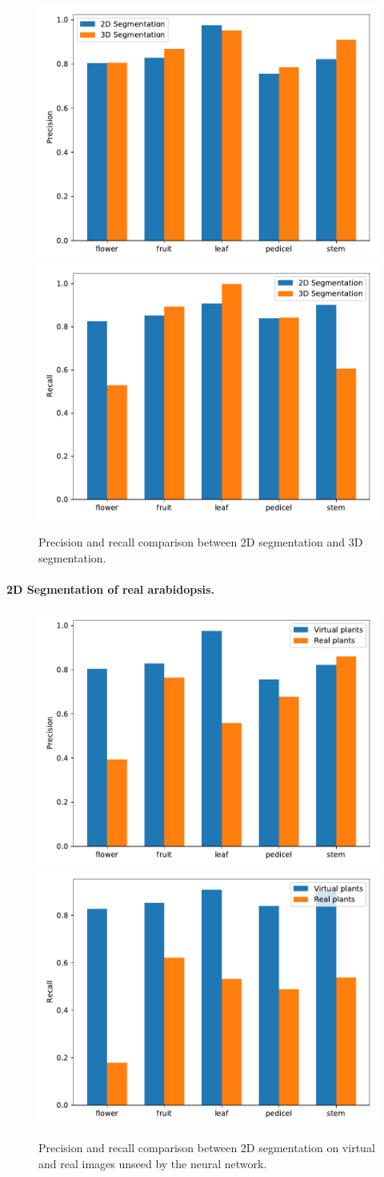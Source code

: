 \begin{figure}
    \centering \includegraphics[width = 0.5\linewidth]{figures/eval_precision.pdf}\includegraphics[width = 0.5\linewidth]{figures/eval_recall.pdf}
    \caption{Precision and recall comparison between 2D segmentation and 3D
segmentation.} \label{fig:prec_recall_2d_3d}
\end{figure}


\paragraph{2D Segmentation of real arabidopsis.}

\begin{figure}
    \centering \includegraphics[width =
0.5\linewidth]{figures/eval_precision_real.pdf}\includegraphics[width =
0.5\linewidth]{figures/eval_recall_real.pdf}
    \caption{Precision and recall comparison between 2D segmentation on
virtual and real images unseed by the neural network.} \label{fig:prec_recall_2d_3d}
\end{figure}

